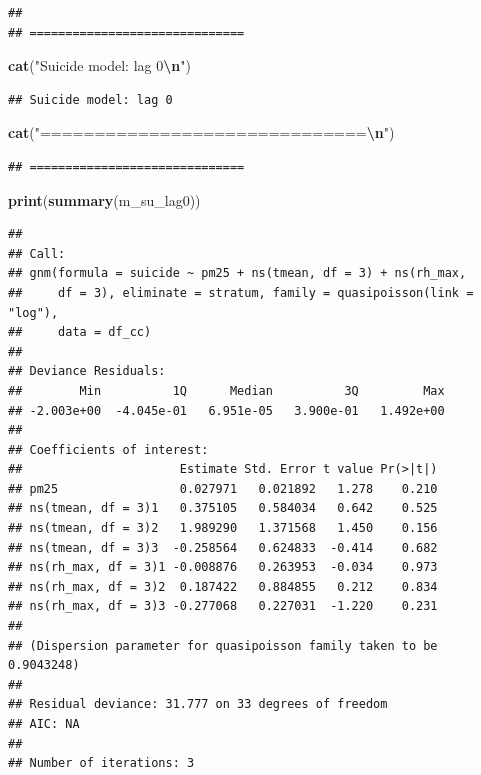 \documentclass[
]{article}
\newenvironment{Shaded}{\begin{snugshade}}{\end{snugshade}}
\newcommand{\FunctionTok}[1]{\textcolor[rgb]{0.13,0.29,0.53}{\textbf{#1}}}
\newcommand{\NormalTok}[1]{#1}
\newcommand{\SpecialCharTok}[1]{\textcolor[rgb]{0.81,0.36,0.00}{\textbf{#1}}}
\newcommand{\StringTok}[1]{\textcolor[rgb]{0.31,0.60,0.02}{#1}}
\begin{document}
\begin{verbatim}
## 
## ==============================
\end{verbatim}

\begin{Shaded}
\begin{Highlighting}[]
\FunctionTok{cat}\NormalTok{(}\StringTok{"Suicide model: lag 0}\SpecialCharTok{\textbackslash{}n}\StringTok{"}\NormalTok{)}
\end{Highlighting}
\end{Shaded}

\begin{verbatim}
## Suicide model: lag 0
\end{verbatim}

\begin{Shaded}
\begin{Highlighting}[]
\FunctionTok{cat}\NormalTok{(}\StringTok{"==============================}\SpecialCharTok{\textbackslash{}n}\StringTok{"}\NormalTok{)}
\end{Highlighting}
\end{Shaded}

\begin{verbatim}
## ==============================
\end{verbatim}

\begin{Shaded}
\begin{Highlighting}[]
\FunctionTok{print}\NormalTok{(}\FunctionTok{summary}\NormalTok{(m\_su\_lag0))}
\end{Highlighting}
\end{Shaded}

\begin{verbatim}
## 
## Call:
## gnm(formula = suicide ~ pm25 + ns(tmean, df = 3) + ns(rh_max, 
##     df = 3), eliminate = stratum, family = quasipoisson(link = "log"), 
##     data = df_cc)
## 
## Deviance Residuals: 
##        Min          1Q      Median          3Q         Max  
## -2.003e+00  -4.045e-01   6.951e-05   3.900e-01   1.492e+00  
## 
## Coefficients of interest:
##                      Estimate Std. Error t value Pr(>|t|)
## pm25                 0.027971   0.021892   1.278    0.210
## ns(tmean, df = 3)1   0.375105   0.584034   0.642    0.525
## ns(tmean, df = 3)2   1.989290   1.371568   1.450    0.156
## ns(tmean, df = 3)3  -0.258564   0.624833  -0.414    0.682
## ns(rh_max, df = 3)1 -0.008876   0.263953  -0.034    0.973
## ns(rh_max, df = 3)2  0.187422   0.884855   0.212    0.834
## ns(rh_max, df = 3)3 -0.277068   0.227031  -1.220    0.231
## 
## (Dispersion parameter for quasipoisson family taken to be 0.9043248)
## 
## Residual deviance: 31.777 on 33 degrees of freedom
## AIC: NA
## 
## Number of iterations: 3
\end{verbatim}
\end{document}
